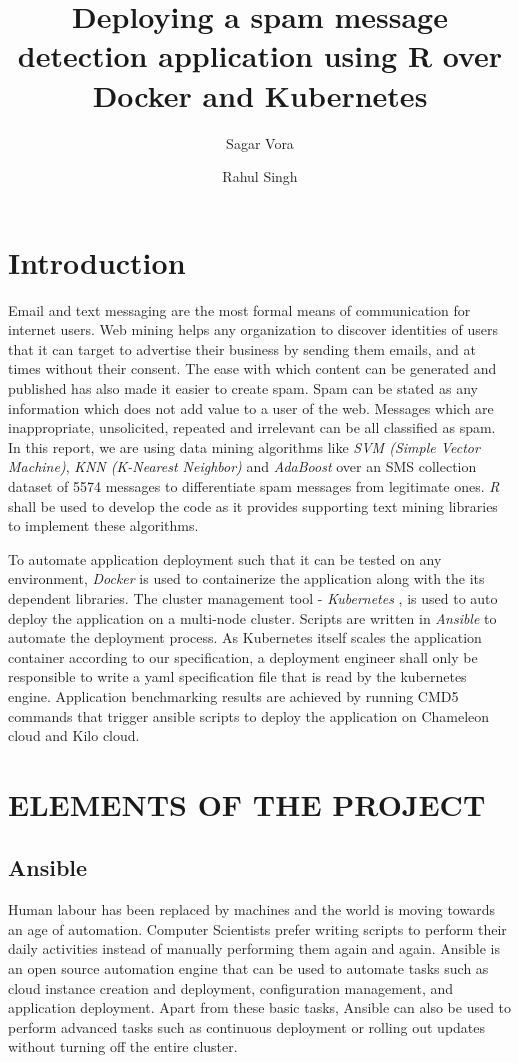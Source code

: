 \documentclass[9pt,twocolumn,twoside]{../../styles/osajnl}
\title{Deploying a spam message detection application using R over Docker and Kubernetes}
\author[1,*]{Sagar Vora}
\author[1,**]{Rahul Singh}
\affil[*]{School of Informatics and Computing, Bloomington, IN 47408, U.S.A.}
\affil[*]{Corresponding authors: vorasagar7@gmail.com, rahul\textunderscore singh919@yahoo.com}
\begin{document}
\maketitle

\section{Introduction}

Email and text messaging are the most formal means of communication
for internet users. Web mining helps any organization to discover
identities of users that it can target to advertise their business by
sending them emails, and at times without their consent. The ease with
which content can be generated and published has also made it easier
to create spam. Spam can be stated as any information which does not
add value to a user of the web. Messages which are inappropriate,
unsolicited, repeated and irrelevant can be all classified as spam. In
this report, we are using data mining algorithms like \emph{SVM
  (Simple Vector Machine)}, \emph{KNN (K-Nearest Neighbor)} and
\emph{AdaBoost} over an SMS collection dataset of 5574 messages to
differentiate spam messages from legitimate ones. \emph{R}
\cite{www-about-rproject} shall be used to develop the code as it
provides supporting text mining libraries to implement these
algorithms.

\noindent
To automate application deployment such that it can be tested on any
environment, \emph{Docker} \cite{www-docker-about} is used to
containerize the application along with the its dependent
libraries. The cluster management tool - \emph{Kubernetes}
\cite{www-kubernetes-home}, is used to auto deploy the application on
a multi-node cluster. Scripts are written in \emph{Ansible}
\cite{www-ansible} to automate the deployment process. As Kubernetes
itself scales the application container according to our
specification, a deployment engineer shall only be responsible to
write a yaml specification file that is read by the kubernetes
engine. Application benchmarking results are achieved by running CMD5
commands that trigger ansible scripts to deploy the application on
Chameleon cloud and Kilo cloud.


\section{ELEMENTS OF THE PROJECT}

\subsection{Ansible}
Human labour has been replaced by machines and the world is moving
towards an age of automation. Computer Scientists prefer writing
scripts to perform their daily activities instead of manually
performing them again and again. Ansible is an open source automation
engine that can be used to automate tasks such as cloud instance
creation and deployment, configuration management, and application
deployment. Apart from these basic tasks, Ansible can also be used to
perform advanced tasks such as continuous deployment or rolling out
updates without turning off the entire cluster.
\end{document}
